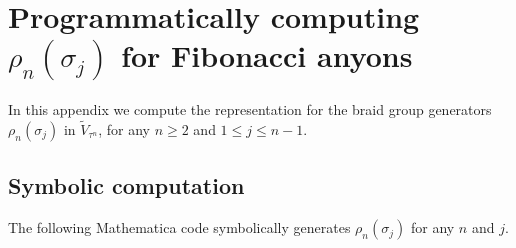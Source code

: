 \documentclass[a4paper,10pt,oneside]{book}
\theoremstyle{plain}
\theoremstyle{definition}
\theoremstyle{remark}
\begin{document}
\appendix


\chapter{Programmatically computing \texorpdfstring{$\rho_n(\sigma_j)$}{ρₙ(σⱼ)} for Fibonacci anyons}\label{sec:code}

In this appendix we compute the representation for the braid group generators $ρ_n(σ_j)$ in $\widetilde{V}_{τ^n}$, for any $n \ge 2$ and $1 \le j \le n-1$.

\section{Symbolic computation}

The following Mathematica code symbolically generates $ρ_n(σ_j)$ for any $n$ and $j$.
\end{document}

